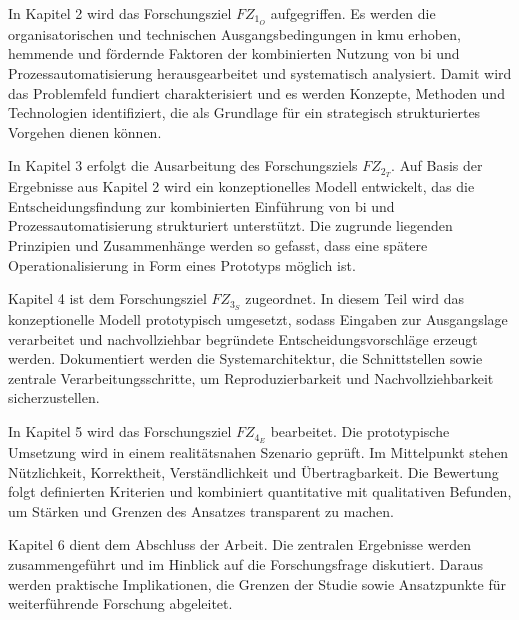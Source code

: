 In Kapitel 2 wird das Forschungsziel $FZ_{1_O}$ aufgegriffen. Es werden die organisatorischen und technischen Ausgangsbedingungen in \gls{kmu} erhoben, hemmende und fördernde Faktoren der kombinierten Nutzung von \gls{bi} und Prozessautomatisierung herausgearbeitet und systematisch analysiert. Damit wird das Problemfeld fundiert charakterisiert und es werden Konzepte, Methoden und Technologien identifiziert, die als Grundlage für ein strategisch strukturiertes Vorgehen dienen können.

In Kapitel 3 erfolgt die Ausarbeitung des Forschungsziels $FZ_{2_T}$. Auf Basis der Ergebnisse aus Kapitel 2 wird ein konzeptionelles Modell entwickelt, das die Entscheidungsfindung zur kombinierten Einführung von \gls{bi} und Prozessautomatisierung strukturiert unterstützt. Die zugrunde liegenden Prinzipien und Zusammenhänge werden so gefasst, dass eine spätere Operationalisierung in Form eines Prototyps möglich ist.

Kapitel 4 ist dem Forschungsziel $FZ_{3_S}$ zugeordnet. In diesem Teil wird das konzeptionelle Modell prototypisch umgesetzt, sodass Eingaben zur Ausgangslage verarbeitet und nachvollziehbar begründete Entscheidungsvorschläge erzeugt werden. Dokumentiert werden die Systemarchitektur, die Schnittstellen sowie zentrale Verarbeitungsschritte, um Reproduzierbarkeit und Nachvollziehbarkeit sicherzustellen.

In Kapitel 5 wird das Forschungsziel $FZ_{4_E}$ bearbeitet. Die prototypische Umsetzung wird in einem realitätsnahen Szenario geprüft. Im Mittelpunkt stehen Nützlichkeit, Korrektheit, Verständlichkeit und Übertragbarkeit. Die Bewertung folgt definierten Kriterien und kombiniert quantitative mit qualitativen Befunden, um Stärken und Grenzen des Ansatzes transparent zu machen.

Kapitel 6 dient dem Abschluss der Arbeit. Die zentralen Ergebnisse werden zusammengeführt und im Hinblick auf die Forschungsfrage diskutiert. Daraus werden praktische Implikationen, die Grenzen der Studie sowie Ansatzpunkte für weiterführende Forschung abgeleitet.
